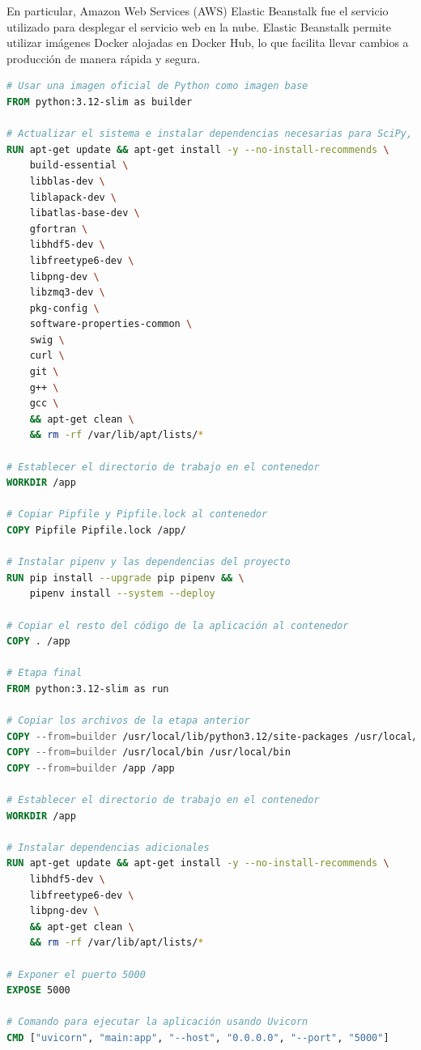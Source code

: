 En particular, Amazon Web Services (AWS) Elastic Beanstalk fue el servicio utilizado para desplegar el servicio web en la nube. Elastic Beanstalk permite utilizar imágenes Docker alojadas en Docker Hub, lo que facilita llevar cambios a producción de manera rápida y segura.

\begin{lstlisting}[language=dockerfile, caption={Dockerfile para el servicio web}, label={lst:dockerfile}]
# Usar una imagen oficial de Python como imagen base
FROM python:3.12-slim as builder

# Actualizar el sistema e instalar dependencias necesarias para SciPy, Scikit-learn, TensorFlow, Keras, etc.
RUN apt-get update && apt-get install -y --no-install-recommends \
    build-essential \
    libblas-dev \
    liblapack-dev \
    libatlas-base-dev \
    gfortran \
    libhdf5-dev \
    libfreetype6-dev \
    libpng-dev \
    libzmq3-dev \
    pkg-config \
    software-properties-common \
    swig \
    curl \
    git \
    g++ \
    gcc \
    && apt-get clean \
    && rm -rf /var/lib/apt/lists/*

# Establecer el directorio de trabajo en el contenedor
WORKDIR /app

# Copiar Pipfile y Pipfile.lock al contenedor
COPY Pipfile Pipfile.lock /app/

# Instalar pipenv y las dependencias del proyecto
RUN pip install --upgrade pip pipenv && \
    pipenv install --system --deploy

# Copiar el resto del código de la aplicación al contenedor
COPY . /app

# Etapa final
FROM python:3.12-slim as run

# Copiar los archivos de la etapa anterior
COPY --from=builder /usr/local/lib/python3.12/site-packages /usr/local/lib/python3.12/site-packages
COPY --from=builder /usr/local/bin /usr/local/bin
COPY --from=builder /app /app

# Establecer el directorio de trabajo en el contenedor
WORKDIR /app

# Instalar dependencias adicionales
RUN apt-get update && apt-get install -y --no-install-recommends \
    libhdf5-dev \
    libfreetype6-dev \
    libpng-dev \
    && apt-get clean \
    && rm -rf /var/lib/apt/lists/*

# Exponer el puerto 5000
EXPOSE 5000

# Comando para ejecutar la aplicación usando Uvicorn
CMD ["uvicorn", "main:app", "--host", "0.0.0.0", "--port", "5000"]
\end{lstlisting}


